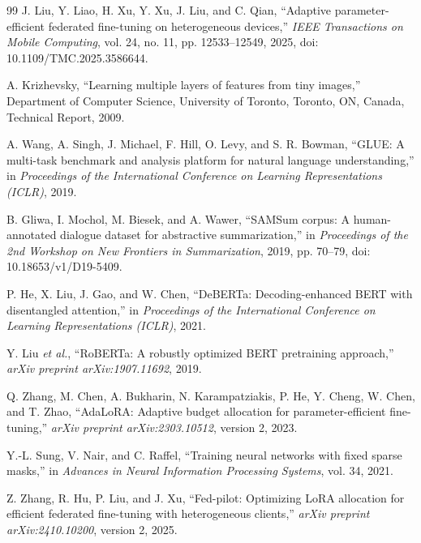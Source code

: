 \documentclass[10pt,conference,letterpaper]{IEEEtran}
\begin{document}
\begin{thebibliography}{99}
J. Liu, Y. Liao, H. Xu, Y. Xu, J. Liu, and C. Qian,
``Adaptive parameter-efficient federated fine-tuning on heterogeneous devices,''
\emph{IEEE Transactions on Mobile Computing}, vol. 24, no. 11, pp. 12533--12549, 2025,
doi: 10.1109/TMC.2025.3586644.

A. Krizhevsky,
``Learning multiple layers of features from tiny images,''
Department of Computer Science, University of Toronto, Toronto, ON, Canada, Technical Report, 2009.

A. Wang, A. Singh, J. Michael, F. Hill, O. Levy, and S. R. Bowman,
``GLUE: A multi-task benchmark and analysis platform for natural language understanding,''
in \emph{Proceedings of the International Conference on Learning Representations (ICLR)}, 2019.

B. Gliwa, I. Mochol, M. Biesek, and A. Wawer,
``SAMSum corpus: A human-annotated dialogue dataset for abstractive summarization,''
in \emph{Proceedings of the 2nd Workshop on New Frontiers in Summarization}, 2019, pp. 70--79,
doi: 10.18653/v1/D19-5409.

P. He, X. Liu, J. Gao, and W. Chen,
``DeBERTa: Decoding-enhanced BERT with disentangled attention,''
in \emph{Proceedings of the International Conference on Learning Representations (ICLR)}, 2021.

Y. Liu \emph{et al.},
``RoBERTa: A robustly optimized BERT pretraining approach,''
\emph{arXiv preprint arXiv:1907.11692}, 2019.

Q. Zhang, M. Chen, A. Bukharin, N. Karampatziakis, P. He, Y. Cheng, W. Chen, and T. Zhao,
``AdaLoRA: Adaptive budget allocation for parameter-efficient fine-tuning,''
\emph{arXiv preprint arXiv:2303.10512}, version 2, 2023.

Y.-L. Sung, V. Nair, and C. Raffel,
``Training neural networks with fixed sparse masks,''
in \emph{Advances in Neural Information Processing Systems}, vol. 34, 2021.

Z. Zhang, R. Hu, P. Liu, and J. Xu,
``Fed-pilot: Optimizing LoRA allocation for efficient federated fine-tuning with heterogeneous clients,''
\emph{arXiv preprint arXiv:2410.10200}, version 2, 2025.
\end{thebibliography}
\end{document}
